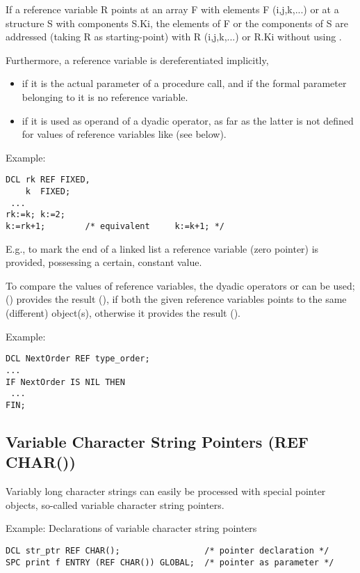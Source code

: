 If a reference variable R points at an array F with elements F
(i,j,k,...) or at a structure S with components S.Ki, the elements of F
or the components of S are addressed (taking R as starting-point) with R
(i,j,k,...) or R.Ki without using .

Furthermore, a reference variable is dereferentiated implicitly,
\begin{itemize}
\item if it is the actual parameter of a procedure call, and if the
formal parameter belonging to it is no reference variable.
\item if it is used as operand of a dyadic operator, as far as the
latter is not defined for values of reference variables like  (see
below).
\end{itemize}

Example:

\begin{lstlisting}
DCL rk REF FIXED,
    k  FIXED;
 ...
rk:=k; k:=2;
k:=rk+1;        /* equivalent     k:=k+1; */
\end{lstlisting}

E.g., to mark the end of a %
linked list a reference variable  (zero
pointer) is provided, possessing a certain, constant value.

To compare the values of reference variables, the dyadic operators 
 or
 can be used;  () provides the result
  (), if both the
given reference variables points to the same (different) object(s),
otherwise it provides the result  ().

Example:

\begin{lstlisting}
DCL NextOrder REF type_order;
...
IF NextOrder IS NIL THEN
 ...
FIN;
\end{lstlisting}

\subsection{Variable Character String Pointers (REF CHAR())}  %
\label{sec_ref_char}

Variably long character strings can easily be processed with special
pointer objects, so-called variable character string pointers.

Example: Declarations of variable character string pointers

\begin{lstlisting}
DCL str_ptr REF CHAR();                 /* pointer declaration */ 
SPC print f ENTRY (REF CHAR()) GLOBAL;  /* pointer as parameter */
\end{lstlisting}


